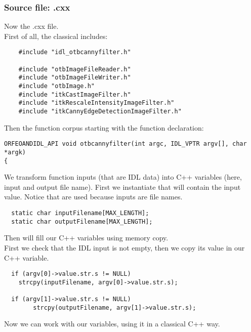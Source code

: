\subsubsection{Source file: .cxx}
Now the .cxx file.\\
First of all, the classical includes:
\begin{verbatim}
    #include "idl_otbcannyfilter.h"

    #include "otbImageFileReader.h"
    #include "otbImageFileWriter.h"
    #include "otbImage.h"
    #include "itkCastImageFilter.h"
    #include "itkRescaleIntensityImageFilter.h"
    #include "itkCannyEdgeDetectionImageFilter.h"
\end{verbatim}
Then the function corpus starting with the function declaration:
\begin{verbatim}
ORFEOANDIDL_API void otbcannyfilter(int argc, IDL_VPTR argv[], char *argk)
{
\end{verbatim}
We transform function inputs (that are IDL data) into C++ variables (here, input and output file name).
First we instantiate  that will contain the input value. Notice that  are used because inputs are file names.
\begin{verbatim}
  static char inputFilename[MAX_LENGTH];
  static char outputFilename[MAX_LENGTH];
\end{verbatim} 
Then will fill our C++ variables using memory copy.\\
First we check that the IDL input is not empty, then we copy its value in our C++ variable.
\begin{verbatim}
  if (argv[0]->value.str.s != NULL)
    strcpy(inputFilename, argv[0]->value.str.s);
  
  if (argv[1]->value.str.s != NULL)
		strcpy(outputFilename, argv[1]->value.str.s);
\end{verbatim}
Now we can work with our variables, using it in a classical C++ way.
